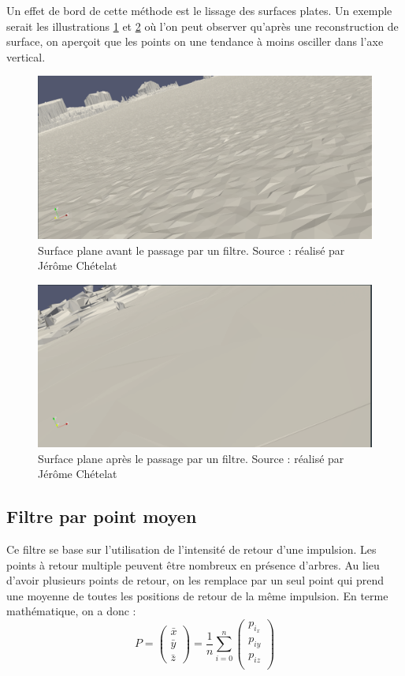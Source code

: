 Un effet de bord de cette méthode est le lissage des surfaces plates. Un exemple serait les illustrations \ref{fig:before_las_filter} et \ref{fig:after_las_filter} où l'on peut observer qu'après une reconstruction de surface, on aperçoit que les points on une tendance à moins osciller dans l'axe vertical.
\begin{figure}[htbp!]
    \centering
    \includegraphics[width=0.8\linewidth]{figures/lissage_brut.png}
    \caption{Surface plane avant le passage par un filtre. Source : réalisé par Jérôme Chételat}
    \label{fig:before_las_filter}
\end{figure}
\begin{figure}[htbp!]
    \centering
    \includegraphics[width=0.8\linewidth]{figures/lissage_filtrer.png}
    \caption{Surface plane après le passage par un filtre. Source : réalisé par Jérôme Chételat}
    \label{fig:after_las_filter}
\end{figure}
\subsection{Filtre par point moyen}

Ce filtre se base sur l'utilisation de l'intensité de retour d'une impulsion. Les points à retour multiple peuvent être nombreux en présence d'arbres. Au lieu d'avoir plusieurs points de retour, on les remplace par un seul point qui prend une moyenne de toutes les positions de retour de la même impulsion. En terme mathématique, on a donc : 
$$
P = 
\begin{pmatrix}
    \bar{x} \\
    \bar{y} \\
    \bar{z}
\end{pmatrix}
=
\frac{1}{n}
\sum_{i=0}^{n}
\begin{pmatrix}
   p_{i_x} \\
   p_{iy} \\
   p_{iz} \\
\end{pmatrix}
$$

